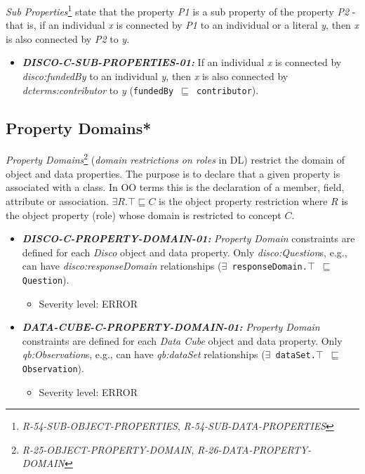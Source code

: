 \documentclass{llncs}
\newcommand{\ms}[1]{\texttt{#1}}
\begin{document}
{\em Sub Properties}\footnote{\emph{R-54-SUB-OBJECT-PROPERTIES}, \emph{R-54-SUB-DATA-PROPERTIES}} state that the property \emph{P1} is a sub property of the property \emph{P2} - that is, if an individual \emph{x} is connected by \emph{P1} to an individual or a literal \emph{y}, then \emph{x} is also connected by \emph{P2} to \emph{y}. 

\begin{itemize}
	\item \textbf{{\em DISCO-C-SUB-PROPERTIES-01:}}
If an individual \emph{x} is connected by {\em disco:fundedBy} to an individual \emph{y}, then \emph{x} is also connected by {\em dcterms:contributor} to \emph{y} (\ms{fundedBy $\sqsubseteq$ contributor}). 
\end{itemize}

\subsection{Property Domains*}

{\em Property Domains}\footnote{{\em R-25-OBJECT-PROPERTY-DOMAIN}, {\em R-26-DATA-PROPERTY-DOMAIN}} ({\em domain restrictions on roles} in DL) restrict the domain of object and data properties.
The purpose is to declare that a given property is associated with a class. 
In OO terms this is the declaration of a member, field, attribute or association. 
$\exists R. \top \sqsubseteq C$ is the object property restriction where $R$ is the object property (role) whose domain is restricted to concept $C$.

\begin{itemize}
	\item \textbf{{\em DISCO-C-PROPERTY-DOMAIN-01:}} 
	{\em Property Domain} constraints are defined for each \emph{Disco} object and data property.
  Only {\em disco:Question}s, e.g., can have {\em disco:responseDomain} relationships (\ms{$\exists$ responseDomain.$\top$ $\sqsubseteq$ Question}).
	\begin{itemize}
		\item Severity level: ERROR
	\end{itemize}
\end{itemize}

\begin{itemize}
	\item \textbf{{\em DATA-CUBE-C-PROPERTY-DOMAIN-01:}} 
	{\em Property Domain} constraints are defined for each \emph{Data Cube} object and data property.
  Only {\em qb:Observation}s, e.g., can have {\em qb:dataSet} relationships (\ms{$\exists$ dataSet.$\top$ $\sqsubseteq$ Observation}).
	\begin{itemize}
		\item Severity level: ERROR
	\end{itemize}
\end{itemize}
\end{document}
